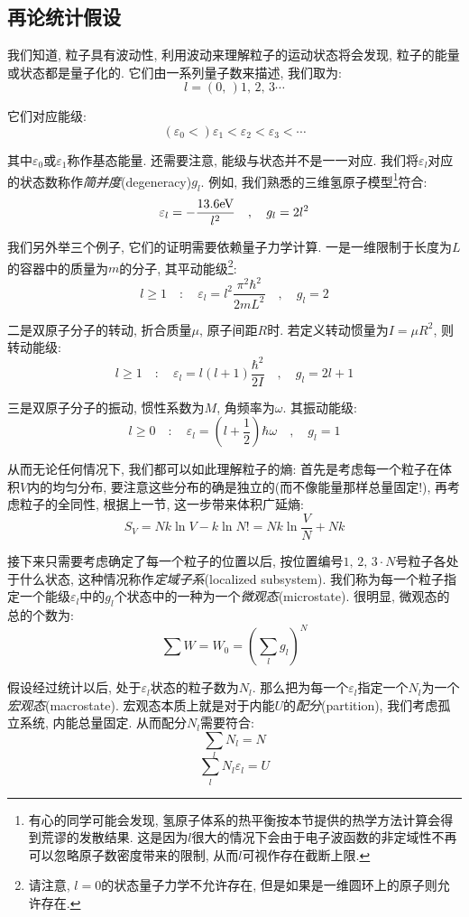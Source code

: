 \subsection{再论统计假设}

我们知道, 粒子具有波动性, 利用波动来理解粒子的运动状态将会发现, 粒子的能量或状态都是量子化的. 它们由一系列量子数来描述, 我们取为:
\[l=(0,\,)1,\,2,\,3\cdots\]

它们对应能级:
\[(\varepsilon_0<)\varepsilon_1<\varepsilon_2<\varepsilon_3<\cdots\]

其中$\varepsilon_0$或$\varepsilon_1$称作基态能量. 还需要注意, 能级与状态并不是一一对应. 我们将$\varepsilon_l$对应的状态数称作\emph{简并度}(degeneracy)$g_l$. 例如, 我们熟悉的三维氢原子模型\footnote{有心的同学可能会发现, 氢原子体系的热平衡按本节提供的热学方法计算会得到荒谬的发散结果. 这是因为$l$很大的情况下会由于电子波函数的非定域性不再可以忽略原子数密度带来的限制, 从而$l$可视作存在截断上限.}符合:
\[\varepsilon_l=-\frac{13.6{\rm eV}}{l^2} \quad,\quad g_l=2l^2\]

我们另外举三个例子, 它们的证明需要依赖量子力学计算. 一是一维限制于长度为$L$的容器中的质量为$m$的分子, 其平动能级\footnote{请注意, $l=0$的状态量子力学不允许存在, 但是如果是一维圆环上的原子则允许存在.}:
\[l\geq 1 \quad:\quad \varepsilon_l=l^2\frac{\pi^2\hbar^2}{2mL^2} \quad,\quad g_l=2\]

二是双原子分子的转动, 折合质量$\mu$, 原子间距$R$时. 若定义转动惯量为$I=\mu R^2$, 则转动能级:
\[l\geq 1 \quad:\quad \varepsilon_l=l(l+1)\frac{\hbar^2}{2I} \quad,\quad g_l=2l+1\]

三是双原子分子的振动, 惯性系数为$M$, 角频率为$\omega$. 其振动能级:
\[l\geq 0 \quad:\quad \varepsilon_l=\left(l+\frac{1}{2}\right)\hbar \omega \quad,\quad g_l=1\]

从而无论任何情况下, 我们都可以如此理解粒子的熵: 首先是考虑每一个粒子在体积$V$内的均匀分布, 要注意这些分布的确是独立的(而不像能量那样总量固定!), 再考虑粒子的全同性, 根据上一节, 这一步带来体积广延熵:
\[S_V=Nk\ln V-k\ln N!=Nk\ln\frac{V}{N}+Nk\]

接下来只需要考虑确定了每一个粒子的位置以后, 按位置编号$1,\,2,\,3\cdot N$号粒子各处于什么状态, 这种情况称作\emph{定域子系}(localized subsystem). 我们称为每一个粒子指定一个能级$\varepsilon_l$中的$g_l$个状态中的一种为一个\emph{微观态}(microstate). 很明显, 微观态的总的个数为:
\[\sum W=W_0=\left(\sum_l g_l\right)^N\]

假设经过统计以后, 处于$\varepsilon_l$状态的粒子数为$N_l$. 那么把为每一个$\varepsilon_l$指定一个$N_l$为一个\emph{宏观态}(macrostate). 宏观态本质上就是对于内能$U$的\emph{配分}(partition), 我们考虑孤立系统, 内能总量固定. 从而配分$N_l$需要符合:
\[\sum_l N_l=N\]
\[\sum_l N_l\varepsilon_l=U\]

